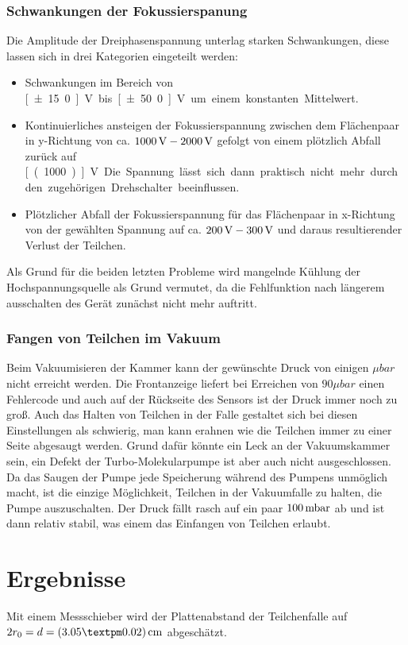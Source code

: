 \documentclass[a4paper,12pt]{article}
\begin{document}
\subsubsection*{Schwankungen der Fokussierspanung}
Die Amplitude der Dreiphasenspannung unterlag starken Schwankungen, diese lassen sich in drei Kategorien eingeteilt werden:
\begin{itemize}
\item
Schwankungen im Bereich von \unit[±15.0]{V} bis \unit[±50.0]{V} um einem konstanten Mittelwert.
\item
Kontinuierliches ansteigen der Fokussierspannung zwischen dem Flächenpaar in y-Richtung von ca. $\unit[1000]{V} - \unit[2000]{V}$ gefolgt von einem plötzlich
Abfall zurück auf \unit[(1000)]{V}. Die Spannung lässt sich dann praktisch nicht mehr durch den zugehörigen Drehschalter beeinflussen.
\item
Plötzlicher Abfall der Fokussierspannung für das Flächenpaar in x-Richtung von der gewählten Spannung auf ca. $\unit[200]{V} - \unit[300]{V}$ und daraus resultierender
Verlust der Teilchen.
\end{itemize}
Als Grund für die beiden letzten Probleme wird mangelnde Kühlung der Hochspannungsquelle als Grund vermutet, da die Fehlfunktion nach längerem ausschalten des Gerät zunächst nicht mehr auftritt.

\subsubsection*{Fangen von Teilchen im Vakuum}
Beim Vakuumisieren der Kammer kann der gewünschte Druck von einigen $\unit{μbar}$ nicht erreicht werden.
Die Frontanzeige liefert bei Erreichen von $90μbar$ einen Fehlercode und auch auf der Rückseite des Sensors ist der Druck immer noch zu groß.
Auch das Halten von Teilchen in der Falle gestaltet sich bei diesen Einstellungen als schwierig, man kann erahnen wie die Teilchen immer zu einer Seite abgesaugt werden.
Grund dafür könnte ein Leck an der Vakuumskammer sein, ein Defekt der Turbo-Molekularpumpe ist aber auch nicht ausgeschlossen.
Da das Saugen der Pumpe jede Speicherung während des Pumpens unmöglich macht, ist die einzige Möglichkeit, Teilchen in der Vakuumfalle zu halten, die Pumpe auszuschalten.
Der Druck fällt rasch auf ein paar $\unit[100] {mbar}$ ab und ist dann relativ stabil, was einem das Einfangen von Teilchen erlaubt.

\section{Ergebnisse}
Mit einem Messschieber wird der Plattenabstand der Teilchenfalle auf $2r_0 = d = \unit[(3.05±0.02)]{cm}$ abgeschätzt.
\end{document}
